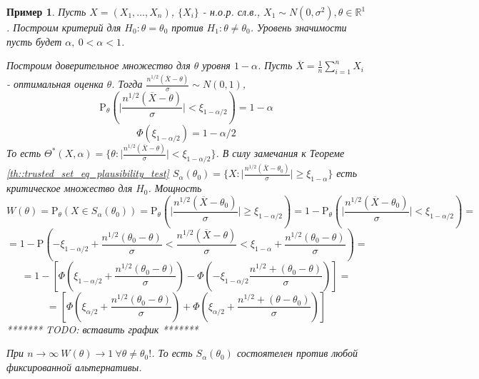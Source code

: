 \documentclass[12pt]{article}
\newtheorem*{example}{Пример}
\theoremstyle{basic_theorem}
\theoremstyle{name_theorem}
\def\R{
    \mathbb{R}
}
\def\P{
    \mathrm{P}
}
\begin{document}
\begin{example}
    Пусть $X=(X_1,\ldots,X_n)$, $\{X_i\}$ - н.о.р. сл.в., $X_1\sim N(0,\sigma^2),\theta\in\R^1$.
    Построим критерий для $H_0:\theta=\theta_0$ против $H_1:\theta\neq\theta_0$.
    Уровень значимости пусть будет $\alpha,\ 0<\alpha<1$.
    
    Построим доверительное множество для $\theta$ уровня $1-\alpha$.
    Пусть $\overline{X}=\frac{1}{n}\sum^n_{i=1}X_i$ - оптимальная оценка $\theta$.
    Тогда $\frac{n^{1/2}(\overline{X}-\theta)}{\sigma}\sim N(0,1)$,
    $$\P_\theta\left(\lvert\frac{n^{1/2}(\overline{X}-\theta)}{\sigma}\rvert<\xi_{1-\alpha/2}\right) = 1-\alpha$$ 
    $$\Phi(\xi_{1-\alpha/2})=1-\alpha/2$$
    То есть $\Theta^*(X,\alpha)=\{\theta:\vert\frac{n^{1/2}(\overline{X}-\theta)}{\sigma}\vert<\xi_{1-\alpha/2}\}$.
    В силу замечания к Теореме \ref{th::trusted_set_eq_plausibility_test}
    $S_{\alpha}(\theta_0)=\{X:\vert\frac{n^{1/2}(\overline{X}-\theta_0)}{\sigma}\vert\geq\xi_{1-\alpha}\}$
    есть критическое множество для $H_0$. Мощность
    $$W(\theta)=\P_\theta(X\in S_\alpha(\theta_0))=\P_\theta(\vert\frac{n^{1/2}(\overline{X}-\theta_0)}{\sigma}\vert\geq\xi_{1-\alpha/2})=
    1-\P_\theta(\vert\frac{n^{1/2}(\overline{X}-\theta_0)}{\sigma}\vert<\xi_{1-\alpha/2})=$$
    $$=1-\P(-\xi_{1-\alpha/2} + \frac{n^{1/2}(\theta_0-\theta)}{\sigma} < \frac{n^{1/2}(\overline{X}-\theta)}{\sigma} < \xi_{1-\alpha}+\frac{n^{1/2}(\theta_0-\theta)}{\sigma})=$$
    $$=1-[\Phi(\xi_{1-\alpha/2}+\frac{n^{1/2}(\theta_0-\theta)}{\sigma}) - \Phi(-\xi_{1-\alpha/2}\frac{n^{1/2}+(\theta_0-\theta)}{\sigma})] = $$
    $$=[\Phi(\xi_{\alpha/2}+\frac{n^{1/2}(\theta_0-\theta)}{\sigma}) + \Phi(\xi_{\alpha/2}+\frac{n^{1/2}+(\theta-\theta_0)}{\sigma})]$$
    ******* TODO: вставить график *******

    При $n\rightarrow\infty\ W(\theta)\rightarrow 1\ \forall\theta\neq\theta_0!$.
    То есть $S_\alpha(\theta_0)$ состоятелен против любой фиксированной альтернативы.
\end{example}
\end{document}

